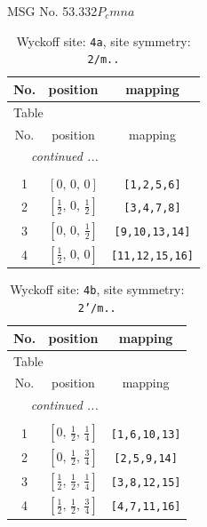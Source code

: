\documentclass[fleqn,8pt]{jsarticle}
\begin{document}
\setcounter{MaxMatrixCols}{32}

\renewcommand{\tablename}{Table~}
\renewcommand{\figurename}{Figure~}
\begin{center}
\LARGE
MSG No. 53.332\quad$P_{c}mna$
\end{center}
\renewcommand{\arraystretch}{1.2}
\begin{longtable}{ccc}
\caption{Wyckoff site: {\tt 4a}, site symmetry: {\tt 2/m..}}
 \\
 \hline \hline
No. & position & mapping \\ \hline \endfirsthead

\multicolumn{2}{l}{\tablename\ \thetable{}} \\
 \hline \hline
No. & position & mapping \\ \hline \endhead

 \hline \hline
\multicolumn{2}{r}{\footnotesize\it continued ...} \\ \endfoot

 \hline \hline
\multicolumn{2}{r}{} \\ \endlastfoot

1 & $\left[ 0,\, 0,\, 0 \right]$ & {\tt [1,2,5,6]} \\ \hline
2 & $\left[ \frac{1}{2},\, 0,\, \frac{1}{2} \right]$ & {\tt [3,4,7,8]} \\ \hline
3 & $\left[ 0,\, 0,\, \frac{1}{2} \right]$ & {\tt [9,10,13,14]} \\ \hline
4 & $\left[ \frac{1}{2},\, 0,\, 0 \right]$ & {\tt [11,12,15,16]} \\
\end{longtable}
\renewcommand{\arraystretch}{1.2}
\begin{longtable}{ccc}
\caption{Wyckoff site: {\tt 4b}, site symmetry: {\tt 2'/m..}}
 \\
 \hline \hline
No. & position & mapping \\ \hline \endfirsthead

\multicolumn{2}{l}{\tablename\ \thetable{}} \\
 \hline \hline
No. & position & mapping \\ \hline \endhead

 \hline \hline
\multicolumn{2}{r}{\footnotesize\it continued ...} \\ \endfoot

 \hline \hline
\multicolumn{2}{r}{} \\ \endlastfoot

1 & $\left[ 0,\, \frac{1}{2},\, \frac{1}{4} \right]$ & {\tt [1,6,10,13]} \\ \hline
2 & $\left[ 0,\, \frac{1}{2},\, \frac{3}{4} \right]$ & {\tt [2,5,9,14]} \\ \hline
3 & $\left[ \frac{1}{2},\, \frac{1}{2},\, \frac{1}{4} \right]$ & {\tt [3,8,12,15]} \\ \hline
4 & $\left[ \frac{1}{2},\, \frac{1}{2},\, \frac{3}{4} \right]$ & {\tt [4,7,11,16]} \\
\end{longtable}
\end{document}
